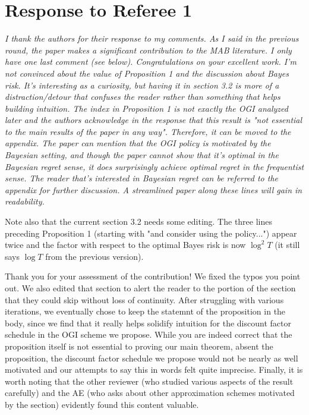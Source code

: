 \documentclass[11pt]{article}
\newcommand{\1}{\ensuremath{\mathbf{1}}} %
\theoremstyle{thm-sf}
\begin{document}
	\newpage
	\section{Response to  Referee 1}
	
	{\it I thank the authors for their response to my comments. As I said in the previous round, the paper makes a significant contribution to the MAB literature. I only have one last comment (see below). Congratulations on your excellent work.
		I'm not convinced about the value of Proposition 1 and the discussion about Bayes risk. It's interesting as a curiosity, but having it in section 3.2 is more of a distraction/detour that confuses the reader rather than something that helps building intuition. The index in Proposition 1 is not exactly the OGI analyzed later and the authors acknowledge in the response that this result is "not essential to the main results of the paper in any way". Therefore, it can be moved to the appendix. The paper can mention that the OGI policy is motivated by the Bayesian setting, and though the paper cannot show that it's optimal in the Bayesian regret sense, it does surprisingly achieve optimal regret in the frequentist sense. The reader that's interested in Bayesian regret can be referred to the appendix for further discussion. A streamlined paper along these lines will gain in readability.
		
Note also that the current section 3.2 needs some editing. The three lines preceding Proposition 1 (starting with "and consider using the policy...") appear twice and the factor with respect to the optimal Bayes risk is now $\log^2 T$ (it still says $\log T$ from the previous version).	
}
\newline
\newline
\noindent
Thank you for your assessment of the contribution! We fixed the typos you point out. We also edited that section to alert the reader to the portion of the section that they could skip without loss of continuity. After struggling with various iterations, we eventually chose to keep the statemnt of the proposition in the body, since we find that it really helps solidify intuition for the discount factor schedule in the OGI scheme we propose. While you are indeed correct that the proposition itself is not essential to proving our main theorem, absent the proposition, the discount factor schedule we propose would not be nearly as well motivated and our attempts to say this in words felt quite imprecise. Finally, it is worth noting that the other reviewer (who studied various aspects of the result carefully) and the AE (who asks about other approximation schemes motivated by the section) evidently found this content valuable. 
	
\end{document}
